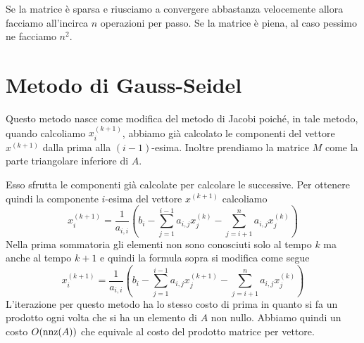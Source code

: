 Se la matrice è sparsa e riusciamo a convergere abbastanza velocemente allora facciamo all'incirca $n$ operazioni
per passo. Se la matrice è piena, al caso pessimo ne facciamo $n^2$.

\section{Metodo di Gauss-Seidel}
Questo metodo nasce come modifica del metodo di Jacobi poiché, in tale metodo, quando calcoliamo $x^{(k+1)}_i$,
abbiamo già calcolato le componenti del vettore $x^{(k+1)}$ dalla prima alla $(i-1)$-esima. Inoltre prendiamo
la matrice $M$ come la parte triangolare inferiore di $A$.

Esso sfrutta le componenti già calcolate per calcolare le successive. Per ottenere quindi la componente
$i$-esima del vettore $x^{(k+1)}$ calcoliamo
\[
	x^{(k+1)}_i =
	\frac{1}{a_{i,i}} \left( b_i - \sum_{j=1}^{i-1} a_{i,j} x^{(k)}_j -
	\sum_{j=i+1}^{n} a_{i,j} x^{(k)}_j \right)
\]
Nella prima sommatoria gli elementi non sono conosciuti solo al tempo $k$ ma anche al tempo $k+1$ e quindi la
formula sopra si modifica come segue
\[
	x^{(k+1)}_i =
	\frac{1}{a_{i,i}} \left( b_i - \sum_{j=1}^{i-1} a_{i,j} x^{(k+1)}_j -
	\sum_{j=i+1}^{n} a_{i,j} x^{(k)}_j \right)
\]
L'iterazione per questo metodo ha lo stesso costo di prima in quanto si fa un prodotto ogni volta che si ha un
elemento di $A$ non nullo. Abbiamo quindi un costo $O(\operatorname{nnz}(A))$ che equivale al costo del prodotto matrice per
vettore.
